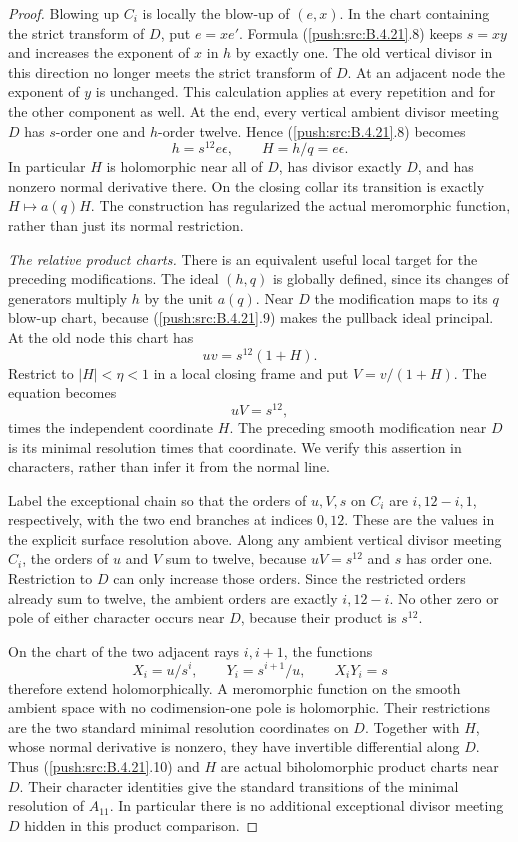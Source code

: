 \begin{proof}
Blowing up $C_i$ is locally the blow-up of $(e,x)$.
In the chart containing the strict transform of $D$, put
$e=xe'$.  Formula (\ref{push:src:B.4.21}.8) keeps $s=xy$ and increases
the exponent of $x$ in $h$ by exactly one.  The old vertical
divisor in this direction no longer meets the strict transform
of $D$.  At an adjacent node the exponent of $y$ is unchanged.
This calculation applies at every repetition and for the
other component as well.  At the end, every vertical ambient
divisor meeting $D$ has $s$-order one and $h$-order twelve.
Hence (\ref{push:src:B.4.21}.8) becomes
\[
 h=s^{12}e\epsilon,
 \qquad H=h/q=e\epsilon.
 \tag{B.4.21.9}
\]
In particular $H$ is holomorphic near all of $D$, has divisor
exactly $D$, and has nonzero normal derivative there.  On the
closing collar its transition is exactly $H\mapsto a(q)H$.
The construction has regularized the actual meromorphic
function, rather than just its normal restriction.

\emph{The relative product charts.}
There is an equivalent useful local target for the preceding
modifications.  The ideal $(h,q)$ is globally defined, since
its changes of generators multiply $h$ by the unit $a(q)$.
Near $D$ the modification maps to its $q$ blow-up chart,
because (\ref{push:src:B.4.21}.9) makes the pullback ideal principal.
At the old node this chart has
\[
 uv=s^{12}(1+H).
\]
Restrict to $|H|<\eta<1$ in a local closing frame and put
$V=v/(1+H)$.  The equation becomes
\[
 uV=s^{12},
\]
times the independent coordinate $H$.
The preceding smooth modification near $D$ is its minimal
resolution times that coordinate.  We verify this assertion
in characters, rather than infer it from the normal line.

Label the exceptional chain so that the orders of $u,V,s$
on $C_i$ are $i,12-i,1$, respectively, with the two end
branches at indices $0,12$.  These are the values in the
explicit surface resolution above.  Along any ambient vertical
divisor meeting $C_i$, the orders of $u$ and $V$ sum to twelve,
because $uV=s^{12}$ and $s$ has order one.  Restriction to
$D$ can only increase those orders.  Since the restricted
orders already sum to twelve, the ambient orders are exactly
$i,12-i$.  No other zero or pole of either character occurs
near $D$, because their product is $s^{12}$.

On the chart of the two adjacent rays $i,i+1$, the functions
\[
 X_i=u/s^i,\qquad Y_i=s^{i+1}/u,
 \qquad X_iY_i=s
 \tag{B.4.21.10}
\]
therefore extend holomorphically.  A meromorphic function on
the smooth ambient space with no codimension-one pole is
holomorphic.  Their restrictions are the two standard minimal
resolution coordinates on $D$.  Together with $H$, whose
normal derivative is nonzero, they have invertible differential
along $D$.  Thus (\ref{push:src:B.4.21}.10) and $H$ are actual biholomorphic
product charts near $D$.  Their character identities give the
standard transitions of the minimal resolution of $A_{11}$.
In particular there is no additional exceptional divisor
meeting $D$ hidden in this product comparison.


\end{proof}
